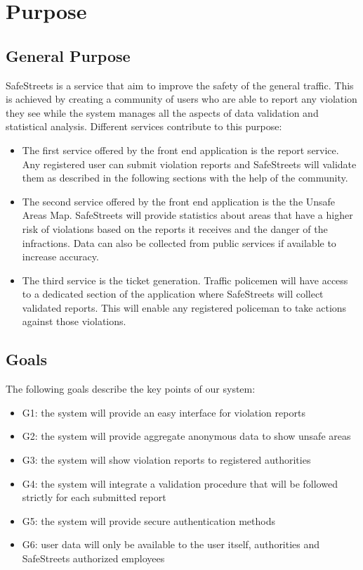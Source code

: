 \section{Purpose}

\subsection{General Purpose}
SafeStreets is a service that aim to improve the safety of the general traffic.
This is achieved by creating a community of users who are able to report any violation they see while the system manages
all the aspects of data validation and statistical analysis.
Different services contribute to this purpose:
\begin{itemize}
  \item The first service offered by the front end application is the report service. Any registered user can submit violation reports and SafeStreets will validate them as described in the following sections with the help of the community.
  \item The second service offered by the front end application is the the Unsafe Areas Map. SafeStreets will provide statistics about areas that have a higher risk of violations based on the reports it receives and the danger of the infractions. Data can also be collected from public services if available to increase accuracy.
  \item The third service is the ticket generation. Traffic policemen will have access to a dedicated section of the application where SafeStreets will collect validated reports. This will enable any registered policeman to take actions against those violations.
\end{itemize}

\subsection{Goals}
The following goals describe the key points of our system:
\begin{itemize}
  \item G1: the system will provide an easy interface for violation reports
  \item G2: the system will provide aggregate anonymous data to show unsafe areas
  \item G3: the system will show violation reports to registered authorities
  \item G4: the system will integrate a validation procedure that will be followed strictly for each submitted report
  \item G5: the system will provide secure authentication methods
  \item G6: user data will only be available to the user itself, authorities and SafeStreets authorized employees
\end{itemize}


